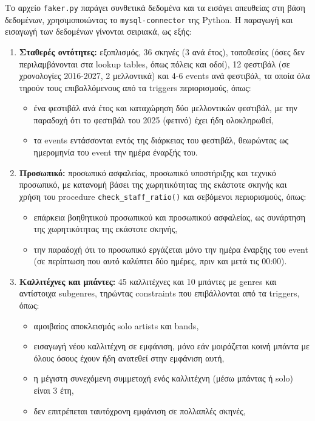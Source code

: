 \documentclass[13pt]{extarticle}
\begin{document}
Το αρχείο \texttt{faker.py} παράγει συνθετικά δεδομένα και τα εισάγει απευθείας στη βάση δεδομένων, χρησιμοποιώντας το \texttt{mysql-connector} της Python. Η παραγωγή και εισαγωγή των δεδομένων γίνονται σειριακά, ως εξής:
\begin{enumerate}
    \item \textbf{Σταθερές οντότητες:} εξοπλισμός, 36 σκηνές (3 ανά έτος), τοποθεσίες (όσες δεν περιλαμβάνονται στα lookup tables, όπως πόλεις και οδοί), 12 φεστιβάλ (σε χρονολογίες 2016-2027, 2 μελλοντικά) και 4-6 events ανά φεστιβάλ, τα οποία όλα τηρούν τους επιβαλλόμενους από τα triggers περιορισμούς, όπως:
    \begin{itemize}
        \item ένα φεστιβάλ ανά έτος και καταχώρηση δύο μελλοντικών φεστιβάλ, με την παραδοχή ότι το φεστιβάλ του 2025 (φετινό) έχει ήδη ολοκληρωθεί,
        \item τα events εντάσσονται εντός της διάρκειας του φεστιβάλ, θεωρώντας ως ημερομηνία του event την ημέρα έναρξής του.
    \end{itemize}
    \item \textbf{Προσωπικό:} προσωπικό ασφαλείας, προσωπικό υποστήριξης και τεχνικό προσωπικό, με κατανομή βάσει της χωρητικότητας της εκάστοτε σκηνής και χρήση του procedure \texttt{check\_staff\_ratio()} και σεβόμενοι περιορισμούς, όπως:
    \begin{itemize}
        \item επάρκεια βοηθητικού προσωπικού και προσωπικού ασφαλείας, ως συνάρτηση της χωρητικότητας της εκάστοτε σκηνής,
        \item την παραδοχή ότι το προσωπικό εργάζεται μόνο την ημέρα έναρξης του event (σε περίπτωση που αυτό καλύπτει δύο ημέρες, πριν και μετά τις 00:00).
    \end{itemize}
    \item \textbf{Καλλιτέχνες και μπάντες:} 45 καλλιτέχνες και 10 μπάντες με genres και αντίστοιχα subgenres, τηρώντας constraints που επιβάλλονται από τα triggers, όπως:
    \begin{itemize}
        \item αμοιβαίος αποκλεισμός solo artists και bands,
        \item εισαγωγή νέου καλλιτέχνη σε εμφάνιση, μόνο εάν μοιράζεται κοινή μπάντα με όλους όσους έχουν ήδη ανατεθεί στην εμφάνιση αυτή,
        \item η μέγιστη συνεχόμενη συμμετοχή ενός καλλιτέχνη (μέσω μπάντας ή solo) είναι 3 έτη,
        \item δεν επιτρέπεται ταυτόχρονη εμφάνιση σε πολλαπλές σκηνές,

\end{itemize}
\end{enumerate}
\end{document}
